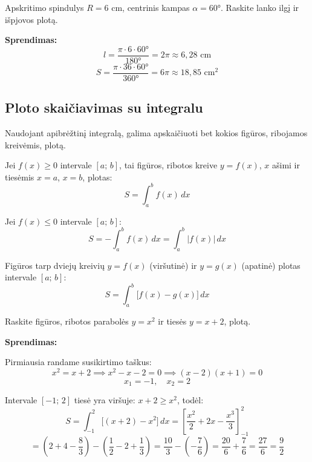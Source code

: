\begin{example}
Apskritimo spindulys $R = 6$ cm, centrinis kampas $\alpha = 60°$. Raskite lanko ilgį ir išpjovos plotą.

\textbf{Sprendimas:}
\[
l = \frac{\pi \cdot 6 \cdot 60°}{180°} = 2\pi \approx 6{,}28 \text{ cm}
\]
\[
S = \frac{\pi \cdot 36 \cdot 60°}{360°} = 6\pi \approx 18{,}85 \text{ cm}^2
\]
\end{example}

\subsection{Ploto skaičiavimas su integralu}

Naudojant apibrėžtinį integralą, galima apskaičiuoti bet kokios figūros, ribojamos kreivėmis, plotą.

\begin{theorem}
Jei $f(x) \geq 0$ intervale $[a;\,b]$, tai figūros, ribotos kreive $y = f(x)$, $x$ ašimi ir tiesėmis $x = a$, $x = b$, plotas:
\[
S = \int_a^b f(x)\,dx
\]
\end{theorem}

\begin{theorem}
Jei $f(x) \leq 0$ intervale $[a;\,b]$:
\[
S = -\int_a^b f(x)\,dx = \int_a^b |f(x)|\,dx
\]
\end{theorem}

\begin{theorem}
Figūros tarp dviejų kreivių $y = f(x)$ (viršutinė) ir $y = g(x)$ (apatinė) plotas intervale $[a;\,b]$:
\[
S = \int_a^b \bigl[f(x) - g(x)\bigr]\,dx
\]
\end{theorem}

\begin{example}
Raskite figūros, ribotos parabolės $y = x^2$ ir tiesės $y = x + 2$, plotą.

\textbf{Sprendimas:}

Pirmiausia randame susikirtimo taškus:
\[
x^2 = x + 2 \implies x^2 - x - 2 = 0 \implies (x-2)(x+1) = 0
\]
\[
x_1 = -1, \quad x_2 = 2
\]

Intervale $[-1;\,2]$ tiesė yra viršuje: $x + 2 \geq x^2$, todėl:
\[
S = \int_{-1}^{2} \bigl[(x+2) - x^2\bigr]\,dx
= \left[\frac{x^2}{2} + 2x - \frac{x^3}{3}\right]_{-1}^{2}
\]
\[
= \left(2 + 4 - \frac{8}{3}\right) - \left(\frac{1}{2} - 2 + \frac{1}{3}\right)
= \frac{10}{3} - \left(-\frac{7}{6}\right) = \frac{20}{6} + \frac{7}{6} = \frac{27}{6} = \frac{9}{2}
\]
\end{example}

